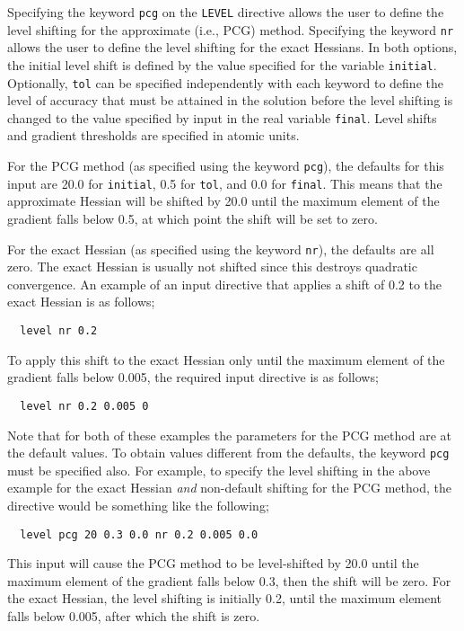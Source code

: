 Specifying the keyword \verb+pcg+ on the \verb+LEVEL+ directive allows
the user to define the level shifting for the approximate (i.e., PCG)
method.  Specifying the keyword \verb+nr+ allows the user to define
the level shifting for the exact Hessians.  In both options, the
initial level shift is defined by the value specified for the variable
\verb+initial+.  Optionally, \verb+tol+ can be specified independently
with each keyword to define the level of accuracy that must be
attained in the solution before the level shifting is changed to the
value specified by input in the real variable \verb+final+.  Level
shifts and gradient thresholds are specified in atomic units.

For the PCG method (as specified using the keyword \verb+pcg+), the
defaults for this input are 20.0 for \verb+initial+, 0.5 for
\verb+tol+, and 0.0 for \verb+final+.  This means that the
approximate Hessian will be shifted by 20.0 until the maximum element
of the gradient falls below 0.5, at which point the shift will be set
to zero.

For the exact Hessian (as specified using the keyword \verb+nr+), the
defaults are all zero.  The exact Hessian is usually not shifted since
this destroys quadratic convergence.  An example of an input directive
that applies a shift of 0.2 to the exact Hessian is as follows;
\begin{verbatim}
  level nr 0.2
\end{verbatim}

To apply this shift to the exact Hessian only until the maximum
element of the gradient falls below 0.005, the required input
directive is as follows;
\begin{verbatim}
  level nr 0.2 0.005 0
\end{verbatim}

Note that for both of these examples the parameters for the PCG method
are at the default values.  To obtain values different from the
defaults, the keyword \verb+pcg+ must be specified also.  For example,
to specify the level shifting in the above example for the exact
Hessian {\em and} non-default shifting for the PCG method, the
directive would be something like the following;
\begin{verbatim}
  level pcg 20 0.3 0.0 nr 0.2 0.005 0.0
\end{verbatim}

This input will cause the PCG method to be level-shifted by 20.0 until
the maximum element of the gradient falls below 0.3, then the shift
will be zero.  For the exact Hessian, the level shifting is initially
0.2, until the maximum element falls below 0.005, after which the
shift is zero. 

